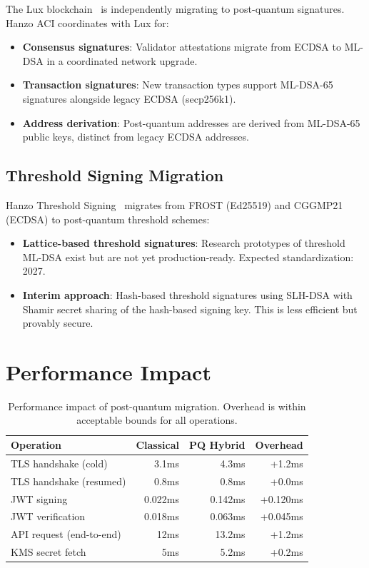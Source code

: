 \documentclass[11pt]{article}
\begin{document}
The Lux blockchain~\cite{luxwhitepaper} is independently migrating to
post-quantum signatures. Hanzo ACI coordinates with Lux for:
\begin{itemize}[leftmargin=1.1em]
    \item \textbf{Consensus signatures}: Validator attestations migrate from
    ECDSA to ML-DSA in a coordinated network upgrade.
    \item \textbf{Transaction signatures}: New transaction types support
    ML-DSA-65 signatures alongside legacy ECDSA (secp256k1).
    \item \textbf{Address derivation}: Post-quantum addresses are derived from
    ML-DSA-65 public keys, distinct from legacy ECDSA addresses.
\end{itemize}

\subsection{Threshold Signing Migration}

Hanzo Threshold Signing~\cite{hanzothreshold} migrates from FROST (Ed25519)
and CGGMP21 (ECDSA) to post-quantum threshold schemes:
\begin{itemize}[leftmargin=1.1em]
    \item \textbf{Lattice-based threshold signatures}: Research prototypes of
    threshold ML-DSA exist but are not yet production-ready. Expected
    standardization: 2027.
    \item \textbf{Interim approach}: Hash-based threshold signatures using
    SLH-DSA with Shamir secret sharing of the hash-based signing key. This
    is less efficient but provably secure.
\end{itemize}

\section{Performance Impact}
\label{sec:performance}

\begin{table}[H]
\centering
\small
\begin{tabular}{lrrr}
\toprule
\textbf{Operation} & \textbf{Classical} & \textbf{PQ Hybrid} & \textbf{Overhead} \\
\midrule
TLS handshake (cold) & 3.1ms & 4.3ms & +1.2ms \\
TLS handshake (resumed) & 0.8ms & 0.8ms & +0.0ms \\
JWT signing & 0.022ms & 0.142ms & +0.120ms \\
JWT verification & 0.018ms & 0.063ms & +0.045ms \\
API request (end-to-end) & 12ms & 13.2ms & +1.2ms \\
KMS secret fetch & 5ms & 5.2ms & +0.2ms \\
\bottomrule
\end{tabular}
\caption{Performance impact of post-quantum migration. Overhead is within
acceptable bounds for all operations.}
\label{tab:perf}
\end{table}
\end{document}

